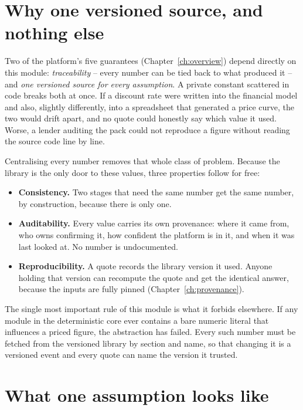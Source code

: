 \section{Why one versioned source, and nothing else}

Two of the platform's five guarantees (Chapter~\ref{ch:overview}) depend directly on this module: \emph{traceability} -- every number can be tied back to what produced it -- and \emph{one versioned source for every assumption}. A private constant scattered in code breaks both at once. If a discount rate were written into the financial model and also, slightly differently, into a spreadsheet that generated a price curve, the two would drift apart, and no quote could honestly say which value it used. Worse, a lender auditing the pack could not reproduce a figure without reading the source code line by line.

Centralising every number removes that whole class of problem. Because the library is the only door to these values, three properties follow for free:

\begin{itemize}
  \item \textbf{Consistency.} Two stages that need the same number get the same number, by construction, because there is only one.
  \item \textbf{Auditability.} Every value carries its own provenance: where it came from, who owns confirming it, how confident the platform is in it, and when it was last looked at. No number is undocumented.
  \item \textbf{Reproducibility.} A quote records the library version it used. Anyone holding that version can recompute the quote and get the identical answer, because the inputs are fully pinned (Chapter~\ref{ch:provenance}).
\end{itemize}

\begin{keyidea}
The single most important rule of this module is what it forbids elsewhere. If any module in the deterministic core ever contains a bare numeric literal that influences a priced figure, the abstraction has failed. Every such number must be fetched from the versioned library by section and name, so that changing it is a versioned event and every quote can name the version it trusted.
\end{keyidea}

\section{What one assumption looks like}

